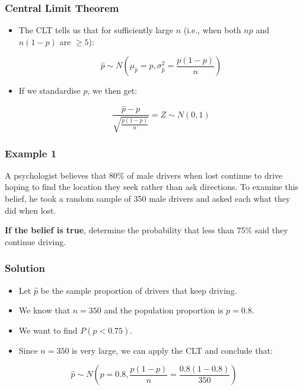 \documentclass[14pt]{beamer}
\begin{document}
\begin{frame}
	\frametitle{Central Limit Theorem}
	
	\begin{itemize}[label={\color{blue}$\blacktriangleright$}]
		\item The CLT tells us that for sufficiently large $n$ (i.e., when both $np$ and $n(1-p)$ are $\geq 5$):
		
		\[
		\hat{p} \sim N \left(\mu_{\hat{p}} = p, \sigma_{\hat{p}}^2 = \frac{p(1-p)}{n}\right)
		\]
		
		\item If we standardise $\hat{p}$, we then get:
		
		\[
		\frac{\hat{p} - p}{\sqrt{\frac{p(1-p)}{n}}} = Z \sim N(0, 1)
		\]
	\end{itemize}
	
\end{frame}

\begin{frame}
	\frametitle{Example 1}
	
A psychologist believes that 80\% of male drivers when lost continue to drive hoping to find the location they seek rather than ask directions. To examine this belief, he took a random sample of 350 male drivers and asked each what they did when lost.

{\bf If the belief is true}, determine the probability that less than 75\% said they continue driving.
	
\end{frame}

\begin{frame}
	\frametitle{Solution}
	
	\begin{itemize}[label={\color{blue}$\blacktriangleright$}]
		\item Let $\hat{p}$ be the sample proportion of drivers that keep driving.
		\item We know that $n = 350$ and the population proportion is $p = 0.8$.
		\item We want to find $P(\hat{p} < 0.75)$.
		\item Since $n = 350$ is very large, we can apply the CLT and conclude that:
	\end{itemize}
	
	\vspace{0.5em}
	
	\[
	\hat{p} \sim N \left(p = 0.8, \frac{p(1-p)}{n} = \frac{0.8(1-0.8)}{350}\right)
	\]
	
\end{frame}
\end{document}
